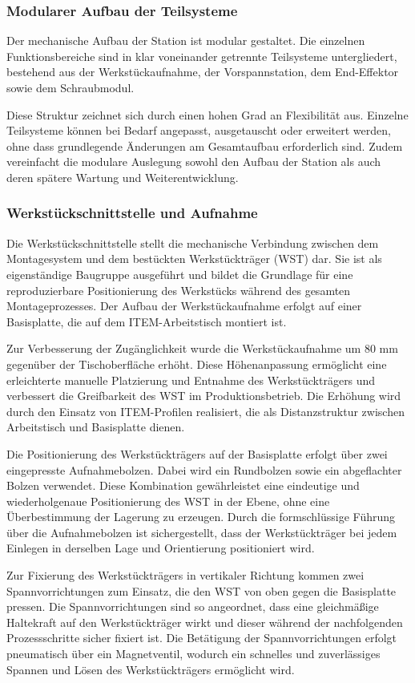 \subsubsection{Modularer Aufbau der Teilsysteme}
Der mechanische Aufbau der Station ist modular gestaltet. Die einzelnen Funktionsbereiche sind in klar voneinander getrennte Teilsysteme untergliedert, bestehend aus der Werkstückaufnahme, der Vorspannstation, dem End-Effektor sowie dem Schraubmodul.

Diese Struktur zeichnet sich durch einen hohen Grad an Flexibilität aus. Einzelne Teilsysteme können bei Bedarf angepasst, ausgetauscht oder erweitert werden, ohne dass grundlegende Änderungen am Gesamtaufbau erforderlich sind. Zudem vereinfacht die modulare Auslegung sowohl den Aufbau der Station als auch deren spätere Wartung und Weiterentwicklung.

\subsubsection{Werkstückschnittstelle und Aufnahme}
Die Werkstückschnittstelle stellt die mechanische Verbindung zwischen dem Montagesystem und dem bestückten Werkstückträger (WST) dar. Sie ist als eigenständige Baugruppe ausgeführt und bildet die Grundlage für eine reproduzierbare Positionierung des Werkstücks während des gesamten Montageprozesses. Der Aufbau der Werkstückaufnahme erfolgt auf einer Basisplatte, die auf dem ITEM-Arbeitstisch montiert ist.

Zur Verbesserung der Zugänglichkeit wurde die Werkstückaufnahme um 80 mm gegenüber der Tischoberfläche erhöht. Diese Höhenanpassung ermöglicht eine erleichterte manuelle Platzierung und Entnahme des Werkstückträgers und verbessert die Greifbarkeit des WST im Produktionsbetrieb. Die Erhöhung wird durch den Einsatz von ITEM-Profilen realisiert, die als Distanzstruktur zwischen Arbeitstisch und Basisplatte dienen.

Die Positionierung des Werkstückträgers auf der Basisplatte erfolgt über zwei eingepresste Aufnahmebolzen. Dabei wird ein Rundbolzen sowie ein abgeflachter Bolzen verwendet. Diese Kombination gewährleistet eine eindeutige und wiederholgenaue Positionierung des WST in der Ebene, ohne eine Überbestimmung der Lagerung zu erzeugen. Durch die formschlüssige Führung über die Aufnahmebolzen ist sichergestellt, dass der Werkstückträger bei jedem Einlegen in derselben Lage und Orientierung positioniert wird.

Zur Fixierung des Werkstückträgers in vertikaler Richtung kommen zwei Spannvorrichtungen zum Einsatz, die den WST von oben gegen die Basisplatte pressen. Die Spannvorrichtungen sind so angeordnet, dass eine gleichmäßige Haltekraft auf den Werkstückträger wirkt und dieser während der nachfolgenden Prozessschritte sicher fixiert ist. Die Betätigung der Spannvorrichtungen erfolgt pneumatisch über ein Magnetventil, wodurch ein schnelles und zuverlässiges Spannen und Lösen des Werkstückträgers ermöglicht wird.

